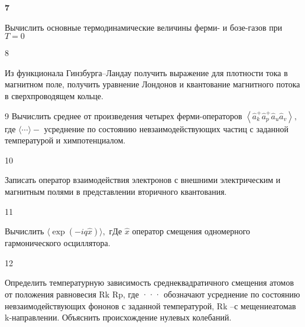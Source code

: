\documentclass[a4paper,12pt]{article} %
\begin{document}
\begin{task}\textbf{7}

Вычислить основные термодинамические величины ферми- и бозе-газов при $T=0$







\end{task}


\begin{task}

8

Из функционала Гинзбурга–Ландау получить выражение для плотности тока в магнитном поле, получить уравнение Лондонов и квантование магнитного потока в сверхпроводящем кольце.


\end{task}


\begin{task}

9
Вычислить среднее от произведения четырех ферми-операторов  $\left\langle\hat{a}_{k}^{+} \hat{a}_{p}^{+} \hat{a}_{u} \hat{a}_{v}\right\rangle,$ где $\langle\cdots\rangle-$ усреднение по состоянию невзаимодействующих частиц с заданной температурой и химпотенциалом.

\end{task}


\begin{task}

10

Записать оператор взаимодействия электронов с внешними электрическим и магнитным полями в представлении вторичного квантования.


\end{task}


\begin{task}

11

Вычислить  $\langle\exp (-i q \hat{x})\rangle, \text { гДе } \hat{x}$ оператор смещения одномерного гармонического осциллятора.




\end{task}


\begin{task}

12

Определить температурную зависимость среднеквадратичного смещения атомов от положения равновесия Rk Rp, где ··· обозначают усреднение по состоянию невзаимодействующих фононов с заданной температурой,  Rk –с мещениеатомав k-направлении. Объяснить происхождение нулевых колебаний.



\end{task}
\end{document}
